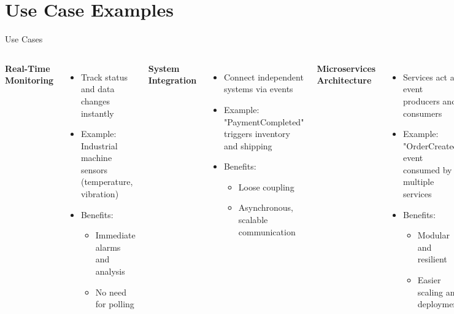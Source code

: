 \documentclass[aspectratio=169, table]{beamer}
\begin{document}
	\section{Use Case Examples}
	
	\begin{frame}[fragile]{Use Cases}
		\vspace{20pt}
		\begin{columns}[T]
			\textbf{Real-Time Monitoring}
			\begin{itemize}
				\item Track status and data changes instantly
				\item Example: Industrial machine sensors (temperature, vibration)
				\item Benefits:
				\begin{itemize}
					\item Immediate alarms and analysis
					\item No need for polling
				\end{itemize}
			\end{itemize}
			
			\textbf{System Integration}
			\begin{itemize}
				\item Connect independent systems via events
				\item Example: "PaymentCompleted" triggers inventory and shipping
				\item Benefits:
				\begin{itemize}
					\item Loose coupling
					\item Asynchronous, scalable communication
				\end{itemize}
			\end{itemize}
			
			\textbf{Microservices Architecture}
			\begin{itemize}
				\item Services act as event producers and consumers
				\item Example: "OrderCreated" event consumed by multiple services
				\item Benefits:
				\begin{itemize}
					\item Modular and resilient
					\item Easier scaling and deployment
				\end{itemize}
			\end{itemize}
		\end{columns}
	\end{frame}
	
\end{document}
